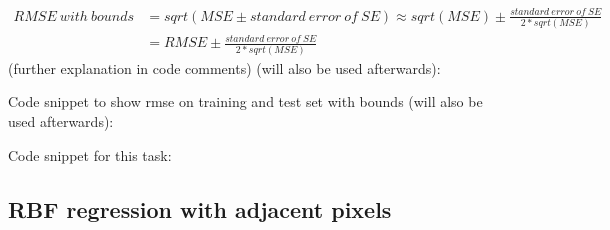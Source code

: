 \documentclass{article}
\begin{document}
\begin{enumerate}[label=(\alph*)]
					\begin{align*}
					RMSE\ with\ bounds &= sqrt(MSE \pm standard\ error\ of\ SE) \approx sqrt(MSE) \pm \frac{standard\ error\ of\ SE}{2 *  sqrt(MSE)} \\
					&= RMSE \pm \frac{standard\ error\ of\ SE}{2 *  sqrt(MSE)}
					\end{align*}
					 (further explanation in code comments)  (will also be used  afterwards):
					
					Code snippet to show rmse on training and test set with bounds (will also be used  afterwards):
					
					Code snippet for this task:
					
			\end{enumerate}
		\subsection{RBF regression with adjacent pixels}
\end{document}
